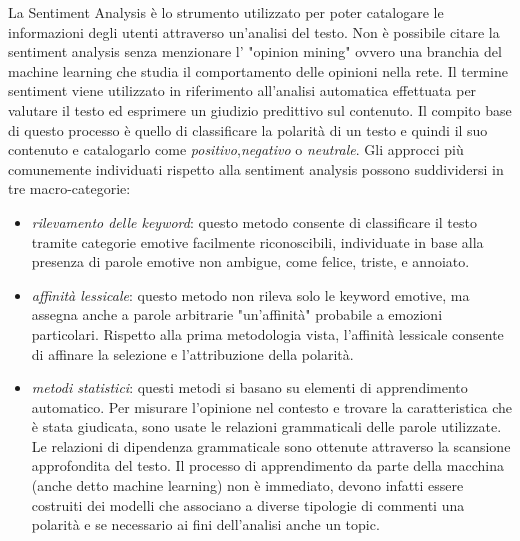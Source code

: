 La Sentiment Analysis è lo strumento utilizzato per poter catalogare le informazioni degli utenti attraverso un'analisi del testo. Non è possibile citare la sentiment analysis senza menzionare l' "opinion mining" ovvero una branchia del machine learning che studia il comportamento delle opinioni nella rete.
Il termine sentiment viene utilizzato in riferimento all'analisi automatica effettuata per valutare il testo ed esprimere un giudizio predittivo sul contenuto.
Il compito base di questo processo è quello di classificare la polarità di un testo e quindi il suo contenuto e catalogarlo come \textit{positivo},\textit{negativo} o \textit{neutrale}.
Gli approcci più comunemente individuati rispetto alla sentiment analysis possono suddividersi in tre macro-categorie: 
\begin{itemize}
\item \textit{rilevamento delle keyword}: questo metodo consente di classificare il testo tramite categorie emotive facilmente riconoscibili, individuate in base alla presenza di parole emotive non ambigue, come felice, triste, e annoiato.
\item \textit{affinità lessicale}: questo metodo non rileva solo le keyword emotive, ma assegna anche a parole arbitrarie "un'affinità" probabile a emozioni particolari. Rispetto alla prima metodologia vista, l'affinità lessicale consente di affinare la selezione e l'attribuzione della polarità.
\item \textit{metodi statistici}: questi metodi si basano su elementi di apprendimento automatico. Per misurare l'opinione nel contesto e trovare la caratteristica che è stata giudicata, sono usate le relazioni grammaticali delle parole utilizzate. Le relazioni di dipendenza grammaticale sono ottenute attraverso la scansione approfondita del testo. Il processo di apprendimento da parte della macchina (anche detto machine learning) non è immediato, devono infatti essere costruiti dei modelli che associano a diverse tipologie di commenti una polarità e se necessario ai fini dell'analisi anche un topic.
\end{itemize}

